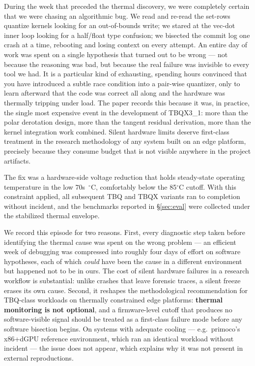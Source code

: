 \documentclass[10pt,twocolumn]{article}
\begin{document}
During the week that preceded the thermal discovery, we were completely certain that we were chasing an algorithmic bug. We read and re-read the set-rows quantize kernels looking for an out-of-bounds write; we stared at the vec-dot inner loop looking for a half/float type confusion; we bisected the commit log one crash at a time, rebooting and losing context on every attempt. An entire day of work was spent on a single hypothesis that turned out to be wrong --- not because the reasoning was bad, but because the real failure was invisible to every tool we had. It is a particular kind of exhausting, spending hours convinced that you have introduced a subtle race condition into a pair-wise quantizer, only to learn afterward that the code was correct all along and the hardware was thermally tripping under load. The paper records this because it was, in practice, the single most expensive event in the development of TBQX3\_1: more than the polar derotation design, more than the tangent residual derivation, more than the kernel integration work combined. Silent hardware limits deserve first-class treatment in the research methodology of any system built on an edge platform, precisely because they consume budget that is not visible anywhere in the project artifacts.

The fix was a hardware-side voltage reduction that holds steady-state operating temperature in the low 70s~$^\circ$C, comfortably below the 85$^\circ$C cutoff. With this constraint applied, all subsequent TBQ and TBQX variants ran to completion without incident, and the benchmarks reported in \S\ref{sec:eval} were collected under the stabilized thermal envelope.

We record this episode for two reasons. First, every diagnostic step taken before identifying the thermal cause was spent on the wrong problem --- an efficient week of debugging was compressed into roughly four days of effort on software hypotheses, each of which \emph{could} have been the cause in a different environment but happened not to be in ours. The cost of silent hardware failures in a research workflow is substantial: unlike crashes that leave forensic traces, a silent freeze erases its own cause. Second, it reshapes the methodological recommendation for TBQ-class workloads on thermally constrained edge platforms: \textbf{thermal monitoring is not optional}, and a firmware-level cutoff that produces no software-visible signal should be treated as a first-class failure mode before any software bisection begins. On systems with adequate cooling --- e.g.\ primoco's x86+dGPU reference environment, which ran an identical workload without incident --- the issue does not appear, which explains why it was not present in external reproductions.
\end{document}
